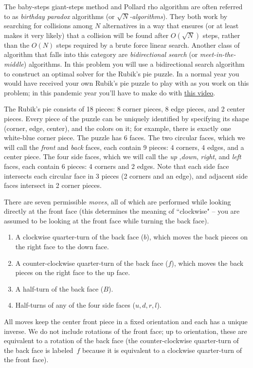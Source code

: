 \documentclass[11pt]{article}
\theoremstyle{definition}
\begin{document}
The baby-steps giant-steps method and Pollard rho algorithm are often referred to as \emph{birthday paradox} algorithms (or \emph{$\sqrt{N}$-algorithms}).
They both work by searching for collisions among $N$ alternatives in a way that ensures (or at least makes it very likely) that a collision will be found after $O(\sqrt{N})$ steps, rather than the $O(N)$ steps required by a brute force linear search.
Another class of algorithm that falls into this category are \emph{bidirectional search} (or \emph{meet-in-the-middle}) algorithms.
In this problem you will use a bidirectional search algorithm to construct an optimal solver for the Rubik's pie puzzle.  In a normal year you would have received your own Rubik's pie puzzle to play with as you work on this problem; in this pandemic year you'll have to make do with \href{https://youtu.be/HlOm9z64cIE}{this video}.

The Rubik's pie consists of 18 pieces: 8 corner pieces, 8 edge pieces, and 2 center pieces.
Every piece of the puzzle can be uniquely identified by specifying its shape (corner, edge, center), and the colors on it; for example, there is exactly one white-blue corner piece.
The puzzle has 6 faces.
The two circular faces, which we will call the \emph{front} and \emph{back} faces, each contain 9 pieces: 4 corners, 4 edges, and a center piece. 
The four side faces, which we will call the \emph{up} ,\emph{down},  \emph{right}, and \emph{left} faces, each contain 6 pieces: 4 corners and 2 edges.
Note that each side face intersects each circular face in 3 pieces (2 corners and an edge), and adjacent side faces intersect in 2 corner pieces.

There are seven permissible \emph{moves}, all of which are performed while looking directly at the front face (this determines the meaning of ``clockwise" -- you are assumed to be looking at the front face while turning the back face).
\begin{enumerate}
\item A clockwise quarter-turn of the back face ($b$), which moves the back pieces on the right face to the down face.
\item A counter-clockwise quarter-turn of the back face ($f$), which moves the back pieces on the right face to the up face.
\item A half-turn of the back face ($B$).
\item Half-turns of any of the four side faces ($u,d,r,l$).
\end{enumerate}
All moves keep the center front piece in a fixed orientation and each has a unique inverse.  We do not include rotations of the front face; up to orientation, these are equivalent to a rotation of the back face (the counter-clockwise quarter-turn of the back face is labeled~$f$ because it is equivalent to a clockwise quarter-turn of the front face).
\end{document}
